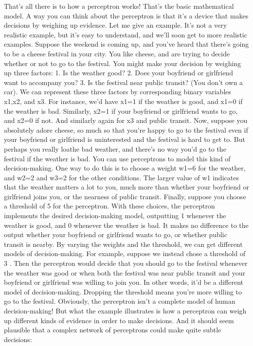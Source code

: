 That's all there is to how a perceptron works!
That's the basic mathematical model. A way you can think about the perceptron is that it's a device that makes decisions by weighing up evidence. Let me give an example. It's not a very realistic example, but it's easy to understand, and we'll soon get to more realistic examples. Suppose the weekend is coming up, and you've heard that there's going to be a cheese festival in your city. You like cheese, and are trying to decide whether or not to go to the festival. You might make your decision by weighing up three factors: 
1. Is the weather good? 
2. Does your boyfriend or girlfriend want to accompany you? 
3. Is the festival near public transit? (You don't own a car). 
We can represent these three factors by corresponding binary variables x1,x2, and x3. For instance, we'd have x1=1 if the weather is good, and x1=0 if the weather is bad. Similarly, x2=1 if your boyfriend or girlfriend wants to go, and x2=0 if not. And similarly again for x3 and public transit.
Now, suppose you absolutely adore cheese, so much so that you're happy to go to the festival even if your boyfriend or girlfriend is uninterested and the festival is hard to get to. But perhaps you really loathe bad weather, and there's no way you'd go to the festival if the weather is bad. You can use perceptrons to model this kind of decision-making. One way to do this is to choose a weight w1=6 for the weather, and w2=2 and w3=2 for the other conditions. The larger value of w1 indicates that the weather matters a lot to you, much more than whether your boyfriend or girlfriend joins you, or the nearness of public transit. Finally, suppose you choose a threshold of 5 for the perceptron. With these choices, the perceptron implements the desired decision-making model, outputting 1 whenever the weather is good, and 0 whenever the weather is bad. It makes no difference to the output whether your boyfriend or girlfriend wants to go, or whether public transit is nearby.
By varying the weights and the threshold, we can get different models of decision-making. For example, suppose we instead chose a threshold of 3 . Then the perceptron would decide that you should go to the festival whenever the weather was good or when both the festival was near public transit and your boyfriend or girlfriend was willing to join you. In other words, it'd be a different model of decision-making. Dropping the threshold means you're more willing to go to the festival.
Obviously, the perceptron isn't a complete model of human decision-making! But what the example illustrates is how a perceptron can weigh up different kinds of evidence in order to make decisions. And it should seem plausible that a complex network of perceptrons could make quite subtle decisions: 

